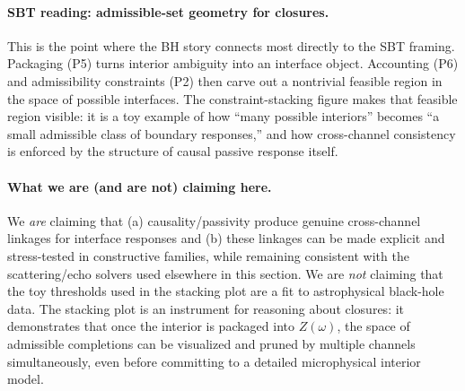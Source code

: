 \paragraph{SBT reading: admissible-set geometry for closures.}
This is the point where the BH story connects most directly to the SBT framing. Packaging (P5) turns interior ambiguity into an interface object. Accounting (P6) and admissibility constraints (P2) then carve out a nontrivial feasible region in the space of possible interfaces. The constraint-stacking figure makes that feasible region visible: it is a toy example of how ``many possible interiors'' becomes ``a small admissible class of boundary responses,'' and how cross-channel consistency is enforced by the structure of causal passive response itself.

\paragraph{What we are (and are not) claiming here.}
We \emph{are} claiming that (a) causality/passivity produce genuine cross-channel linkages for interface responses and (b) these linkages can be made explicit and stress-tested in constructive families, while remaining consistent with the scattering/echo solvers used elsewhere in this section.
We are \emph{not} claiming that the toy thresholds used in the stacking plot are a fit to astrophysical black-hole data. The stacking plot is an instrument for reasoning about closures: it demonstrates that once the interior is packaged into $Z(\omega)$, the space of admissible completions can be visualized and pruned by multiple channels simultaneously, even before committing to a detailed microphysical interior model.
